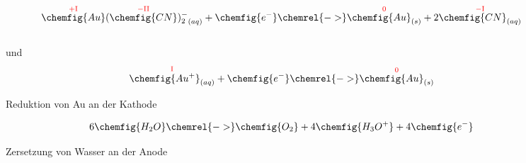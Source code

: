 \begin{figure}[H]\centering
    $${\overset{\mathrm{\color{red}{+I}}}{\chemfig{Au}} (\overset{\mathrm{\color{red}{-II}}}{\chemfig{CN}})_2^{-}}_{(aq)} + \chemfig{e^{-}} \chemrel{->} \overset{\mathrm{\color{red}{0}}}{\chemfig{Au}_{(s)}} + 2\overset{\mathrm{\color{red}{-I}}}{\chemfig{CN}_{(aq)}}$$
    \\ und \\
    $$\overset{\mathrm{\color{red}{I}}}{\chemfig{Au^{+}}_{(aq)}} + \chemfig{e^{-}} \chemrel{->} \overset{\mathrm{\color{red}{0}}}{\chemfig{Au}_{(s)}}$$
    \caption{Reduktion von Au an der Kathode}
    $$6\chemfig{H_2O} \chemrel{->} \chemfig{O_2} + 4\chemfig{H_3O^{+}} + 4\chemfig{e^{-}}$$
    \caption{Zersetzung von Wasser an der Anode}
\end{figure}